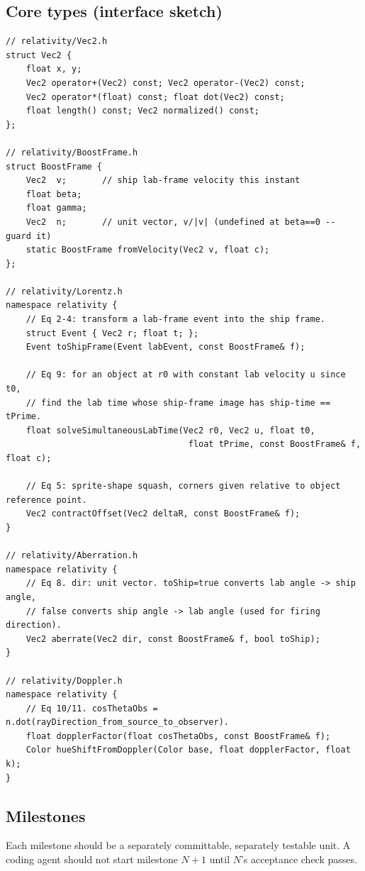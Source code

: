 \documentclass[11pt]{article}
\begin{document}
\subsection{Core types (interface sketch)}
\begin{lstlisting}
// relativity/Vec2.h
struct Vec2 {
    float x, y;
    Vec2 operator+(Vec2) const; Vec2 operator-(Vec2) const;
    Vec2 operator*(float) const; float dot(Vec2) const;
    float length() const; Vec2 normalized() const;
};

// relativity/BoostFrame.h
struct BoostFrame {
    Vec2  v;       // ship lab-frame velocity this instant
    float beta;
    float gamma;
    Vec2  n;       // unit vector, v/|v| (undefined at beta==0 -- guard it)
    static BoostFrame fromVelocity(Vec2 v, float c);
};

// relativity/Lorentz.h
namespace relativity {
    // Eq 2-4: transform a lab-frame event into the ship frame.
    struct Event { Vec2 r; float t; };
    Event toShipFrame(Event labEvent, const BoostFrame& f);

    // Eq 9: for an object at r0 with constant lab velocity u since t0,
    // find the lab time whose ship-frame image has ship-time == tPrime.
    float solveSimultaneousLabTime(Vec2 r0, Vec2 u, float t0,
                                    float tPrime, const BoostFrame& f, float c);

    // Eq 5: sprite-shape squash, corners given relative to object reference point.
    Vec2 contractOffset(Vec2 deltaR, const BoostFrame& f);
}

// relativity/Aberration.h
namespace relativity {
    // Eq 8. dir: unit vector. toShip=true converts lab angle -> ship angle,
    // false converts ship angle -> lab angle (used for firing direction).
    Vec2 aberrate(Vec2 dir, const BoostFrame& f, bool toShip);
}

// relativity/Doppler.h
namespace relativity {
    // Eq 10/11. cosThetaObs = n.dot(rayDirection_from_source_to_observer).
    float dopplerFactor(float cosThetaObs, const BoostFrame& f);
    Color hueShiftFromDoppler(Color base, float dopplerFactor, float k);
}
\end{lstlisting}

\subsection{Milestones}
Each milestone should be a separately committable, separately testable unit. A coding agent should not start milestone $N{+}1$ until $N$'s acceptance check passes.
\end{document}
